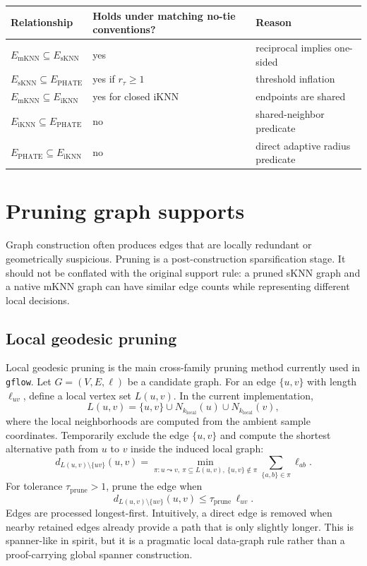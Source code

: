 \documentclass[11pt]{article}
\begin{document}
\begin{center}
\small
\begin{tabular}{lll}
\toprule
Relationship & Holds under matching no-tie conventions? & Reason \\
\midrule
\(E_{\mathrm{mKNN}}\subseteq E_{\mathrm{sKNN}}\) & yes & reciprocal implies one-sided \\
\(E_{\mathrm{sKNN}}\subseteq E_{\mathrm{PHATE}}\) & yes if \(r_\tau\ge 1\) & threshold inflation \\
\(E_{\mathrm{mKNN}}\subseteq E_{\mathrm{iKNN}}\) & yes for closed iKNN & endpoints are shared \\
\(E_{\mathrm{iKNN}}\subseteq E_{\mathrm{PHATE}}\) & no & shared-neighbor predicate \\
\(E_{\mathrm{PHATE}}\subseteq E_{\mathrm{iKNN}}\) & no & direct adaptive radius predicate \\
\bottomrule
\end{tabular}
\end{center}

\section{Pruning graph supports}

Graph construction often produces edges that are locally redundant or geometrically
suspicious.  Pruning is a post-construction sparsification stage.  It should not be
conflated with the original support rule: a pruned sKNN graph and a native mKNN graph can
have similar edge counts while representing different local decisions.

\subsection{Local geodesic pruning}

Local geodesic pruning is the main cross-family pruning method currently used in
\texttt{gflow}.  Let \(G=(V,E,\ell)\) be a candidate graph.  For an edge \(\{u,v\}\) with
length \(\ell_{uv}\), define a local vertex set \(L(u,v)\).  In the current implementation,
\[
  L(u,v)=\{u,v\}\cup N_{k_{\mathrm{local}}}(u)\cup N_{k_{\mathrm{local}}}(v),
\]
where the local neighborhoods are computed from the ambient sample coordinates.  Temporarily
exclude the edge \(\{u,v\}\) and compute the shortest alternative path from \(u\) to \(v\)
inside the induced local graph:
\[
  d_{L(u,v)\setminus\{uv\}}(u,v)
  =
  \min_{\pi:u\leadsto v,\ \pi\subseteq L(u,v),\ \{u,v\}\notin\pi}
  \sum_{\{a,b\}\in\pi}\ell_{ab}.
\]
For tolerance \(\tau_{\mathrm{prune}}>1\), prune the edge when
\[
  d_{L(u,v)\setminus\{uv\}}(u,v)
  \le
  \tau_{\mathrm{prune}}\,\ell_{uv}.
\]
Edges are processed longest-first.  Intuitively, a direct edge is removed when nearby
retained edges already provide a path that is only slightly longer.  This is spanner-like in
spirit, but it is a pragmatic local data-graph rule rather than a proof-carrying global
spanner construction.
\end{document}
